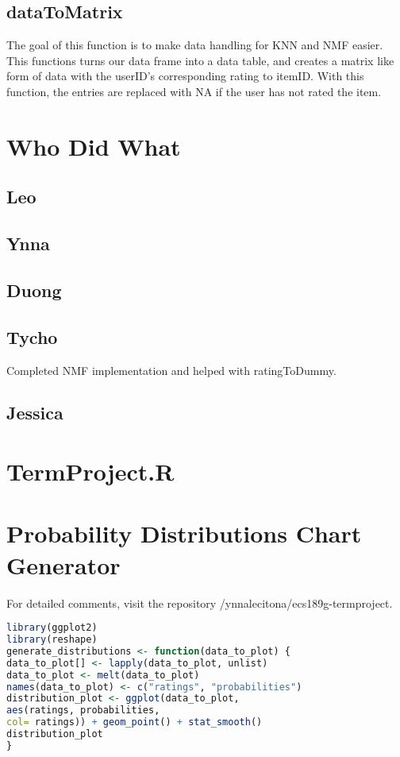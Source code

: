 \documentclass{article}
\begin{document}
\subsection{dataToMatrix} 
The goal of this function is to make data handling for KNN and NMF easier. This functions turns our data frame into a data table, and creates a matrix like form of data with the userID's corresponding rating to itemID. With this function, the entries are replaced with NA if the user has not rated the item. 

\newpage
\section{Who Did What}
\subsection{Leo}

\subsection{Ynna}

\subsection{Duong}

\subsection{Tycho}
Completed NMF implementation and helped with ratingToDummy.

\subsection{Jessica}

\newpage
\appendix
\section{TermProject.R}

\section{Probability Distributions Chart Generator}
For detailed comments, visit the repository
/ynnalecitona/ecs189g-termproject.
\begin{lstlisting}[language=R]
library(ggplot2)
library(reshape)
generate_distributions <- function(data_to_plot) {
data_to_plot[] <- lapply(data_to_plot, unlist)
data_to_plot <- melt(data_to_plot)
names(data_to_plot) <- c("ratings", "probabilities")
distribution_plot <- ggplot(data_to_plot, 
aes(ratings, probabilities, 
col= ratings)) + geom_point() + stat_smooth()
distribution_plot
}
\end{lstlisting}
\end{document}
